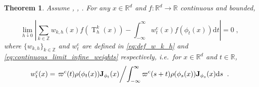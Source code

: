 \documentclass{article}
\newtheorem{theorem}{Theorem}
\def\transfo{\operatorname{T}}
\def\rmd{\operatorname{d}\hspace{-2pt}}
\def\rset{\mathbb{R}}
\def\rmd{\mathrm{d}}
\def\eqsp{\,}
\def\ie{\textit{i.e.}}
\def\eqsp{\;}
\newcommand{\1}{\mathds{1}}
\def\Jac{\mathbf{J}}
\newcommand{\JacOp}[1]{\Jac_{#1}}
\def\rset{\mathbb{R}}
\def\zset{\mathbb{Z}}
\def\rmd{\mathrm{d}}
\def\wcont{w_t^\mathrm{c}}
\def\varpic{\varpi^{\mathrm{c}}}
\begin{document}
\begin{theorem}
\label{theo:convergence}
 Assume  , ,  
 . 
 For any $x\in\rset^d$ and $f: \rset^d \to \rset$ continuous and bounded,

 \begin{equation*}
      \lim_{h\downarrow0} \left\vert \sum_{k\in\zset} w_{k,h}(x) f(\transfo^k_h(x)) - \int_{-\infty}^\infty \wcont(x)f(\phi_t(x))\rmd t  \right\vert=0 \eqsp,
    \end{equation*}
    where $\{w_{k,h}\}_{k \in\zset}$ and $\wcont$ are defined in  \eqref{eq:def_w_k_h} and \eqref{eq:continuous_limit_infine_weights} respectively, \ie~for $x \in\rset^d$ and $t \in \rset$,
    \begin{equation}
      \label{eq:2}
         \wcont( x) = \left.{\varpic(t)\rho(\phi_t(x)) \JacOp{\phi_t}(x)}\middle/{\int_{-\infty}^{\infty}\varpic({s+t})\rho(\phi_s(x)) \JacOp{\phi_s}(x)\rmd s}\right.\eqsp.
    \end{equation}
\end{theorem}
\end{document}
